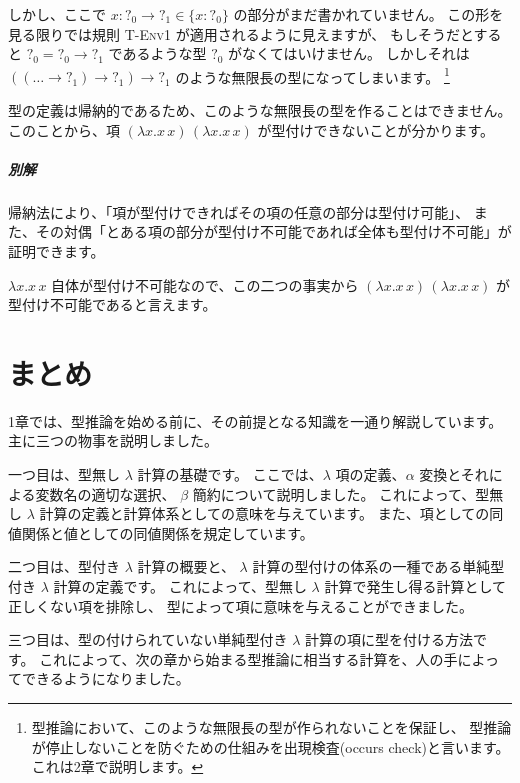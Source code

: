 \begin{exercise}
しかし、ここで $x : ?_0 \to ?_1 \in \{x : ?_0\}$ の部分がまだ書かれていません。
この形を見る限りでは規則 \textsc{T-Env1} が適用されるように見えますが、
もしそうだとすると $?_0 = ?_0 \to ?_1$ であるような型 $?_0$ がなくてはいけません。
しかしそれは $((\dots \to ?_1) \to ?_1) \to ?_1$ のような無限長の型になってしまいます。
\footnote{型推論において、このような無限長の型が作られないことを保証し、
型推論が停止しないことを防ぐための仕組みを出現検査(occurs check)と言います。
これは2章で説明します。}

型の定義は帰納的であるため、このような無限長の型を作ることはできません。
このことから、項 $(\lambda x . x \, x) \, (\lambda x . x \, x)$ が型付けできないことが分かります。

\subparagraph{別解}

帰納法により、「項が型付けできればその項の任意の部分は型付け可能」、
また、その対偶「とある項の部分が型付け不可能であれば全体も型付け不可能」が証明できます。

$\lambda x . x \, x$ 自体が型付け不可能なので、この二つの事実から
$(\lambda x . x \, x) \, (\lambda x . x \, x)$ が型付け不可能であると言えます。

\end{exercise}




\section{まとめ}

1章では、型推論を始める前に、その前提となる知識を一通り解説しています。主に三つの物事を説明しました。

一つ目は、型無し $\lambda$ 計算の基礎です。
ここでは、$\lambda$ 項の定義、$\alpha$ 変換とそれによる変数名の適切な選択、
$\beta$ 簡約について説明しました。
これによって、型無し $\lambda$ 計算の定義と計算体系としての意味を与えています。
また、項としての同値関係と値としての同値関係を規定しています。

二つ目は、型付き $\lambda$ 計算の概要と、
$\lambda$ 計算の型付けの体系の一種である単純型付き $\lambda$ 計算の定義です。
これによって、型無し $\lambda$ 計算で発生し得る計算として正しくない項を排除し、
型によって項に意味を与えることができました。

三つ目は、型の付けられていない単純型付き $\lambda$ 計算の項に型を付ける方法です。
これによって、次の章から始まる型推論に相当する計算を、人の手によってできるようになりました。

